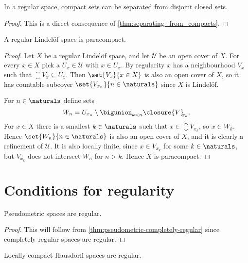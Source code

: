 \documentclass[article, a4paper, 11pt, oneside]{memoir}
\numberwithin{equation}{chapter}
\newcommand{\calU}{\mathcal{U}}
\begin{document}
\begin{proposition}
    In a regular space, compact sets can be separated from disjoint closed sets.
\end{proposition}

\begin{proof}
    This is a direct consequence of \cref{thm:separating_from_compacts}.
\end{proof}


\begin{proposition}
    \label{thm:regular-Lindelof-is-paracompact}
    A regular Lindelöf space is paracompact.
\end{proposition}

\begin{proof}
    Let $X$ be a regular Lindelöf space, and let $\calU$ be an open cover of $X$. For every $x \in X$ pick a $U_x \in \calU$ with $x \in U_x$. By regularity $x$ has a neighbourhood $V_x$ such that $\closure{V}_{\!\!x} \subseteq U_x$. Then $\set{V_x}{x \in X}$ is also an open cover of $X$, so it has countable subcover $\set{V_{x_n}}{n \in \naturals}$ since $X$ is Lindelöf.

    For $n \in \naturals$ define sets
    \begin{equation*}
        W_n = U_{x_n} \setminus \bigunion_{k < n} \closure{V}_{\!\!x_k}.
    \end{equation*}
    For $x \in X$ there is a smallest $k \in \naturals$ such that $x \in \closure{V}_{\!\!x_k}$, so $x \in W_k$. Hence $\set{W_n}{n \in \naturals}$ is also an open cover of $X$, and it is clearly a refinement of $\calU$. It is also locally finite, since $x \in V_{x_k}$ for some $k \in \naturals$, but $V_{x_k}$ does not intersect $W_n$ for $n > k$. Hence $X$ is paracompact.
\end{proof}


\section{Conditions for regularity}

\begin{corollary}
    Pseudometric spaces are regular.
\end{corollary}

\begin{proof}
    This will follow from \cref{thm:pseudometric-completely-regular} since completely regular spaces are regular.
\end{proof}


\begin{corollary}
    Locally compact Hausdorff spaces are regular.
\end{corollary}
\end{document}
